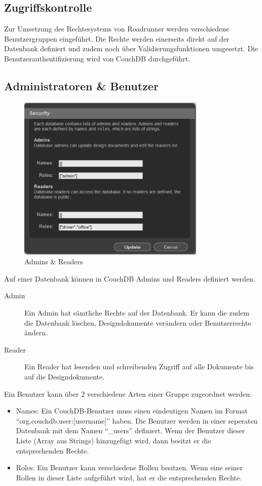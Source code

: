 \subsection{Zugriffskontrolle}

Zur Umsetzung des Rechtesystems von Roadrunner werden verschiedene Benutzergruppen eingeführt. Die Rechte werden einerseits direkt auf der Datenbank definiert und zudem noch über Validierungsfunktionen umgesetzt. Die Benutzerauthentifizierung wird von CouchDB durchgeführt.

\subsection{Administratoren \& Benutzer}

\begin{figure}
	\centering
		\includegraphics[width=0.8\textwidth]{files/pdf/security.pdf}
	\caption{Admins \& Readers}
	\label{fig:security}
\end{figure}

Auf einer Datenbank können in CouchDB Admins und Readers definiert werden. 
\begin{description}
\item[Admin] Ein Admin hat sämtliche Rechte auf der Datenbank. Er kann die zudem die Datenbank löschen, Designdokumente verändern oder Benutzerrechte ändern.
\item[Reader] Ein Reader hat lesenden und schreibenden Zugriff auf alle Dokumente bis auf die Designdokumente.
\end{description}

\noindent Ein Benutzer kann über 2 verschiedene Arten einer Gruppe zugeordnet werden:
 \begin{itemize}
\item Names: Ein CouchDB-Benutzer muss einen eindeutigen Namen im Format "`org.couchdb.user:[username]"' haben. Die Benutzer werden in einer seperaten Datenbank mit dem Namen "`\_users"' definiert. Wenn der Benutzer dieser Liste (Array aus Strings) hinzugefügt wird, dann besitzt er die entsprechenden Rechte.
\item Roles: Ein Benutzer kann verschiedene Rollen besitzen. Wenn eine seiner Rollen in dieser Liste aufgeführt wird, hat er die entsprechenden Rechte. 
\end{itemize}

